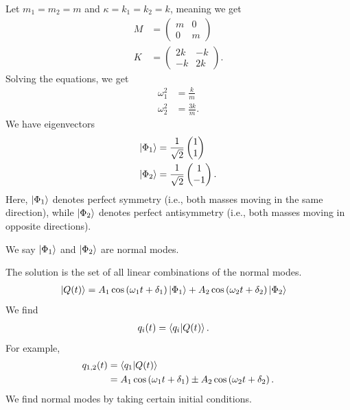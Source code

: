 \documentclass[10pt]{mypackage}
\begin{document}
\begin{example}
  Let $m_1 = m_2 = m$ and $\kappa = k_1 = k_2 = k$, meaning we get
  \begin{align*}
    M &= \begin{pmatrix}m & 0 \\ 0 & m\end{pmatrix}\\
    K &= \begin{pmatrix}2k & -k \\ -k & 2k\end{pmatrix}.
  \end{align*}
  Solving the equations, we get
  \begin{align*}
    \omega_1^2 &= \frac{k}{m}\\
    \omega_2^2 &= \frac{3k}{m}.
  \end{align*}
  We have eigenvectors
  \begin{align*}
    \ket{\Phi_1} &= \frac{1}{\sqrt{2}}\begin{pmatrix}1\\1\end{pmatrix}\\
    \ket{\Phi_2} &= \frac{1}{\sqrt{2}} \begin{pmatrix}1\\-1\end{pmatrix}.
  \end{align*}
  Here, $\ket{\Phi_1}$ denotes perfect symmetry (i.e., both masses moving in the same direction), while $\ket{\Phi_2}$ denotes perfect antisymmetry (i.e., both masses moving in opposite directions).\newline

  We say $\ket{\Phi_1}$ and $\ket{\Phi_2}$ are normal modes.\newline

  The solution is the set of all linear combinations of the normal modes.
  \begin{align*}
    \ket{Q(t)} &= A_1\cos\left(\omega_1 t + \delta_1\right) \ket{\Phi_1} + A_2\cos\left(\omega_2 t + \delta_2\right) \ket{\Phi_2}
  \end{align*}
  We find
  \begin{align*}
    q_{i}(t) &= \braket{q_i}{Q(t)}.
  \end{align*}
  For example,
  \begin{align*}
    q_{1,2}(t) &= \braket{q_1}{Q(t)}\\
           &= A_1\cos\left(\omega_1 t + \delta_1\right) \pm A_2 \cos\left(\omega_2 t + \delta_2\right).
  \end{align*}
  We find normal modes by taking certain initial conditions.\newline


\end{example}
\end{document}
